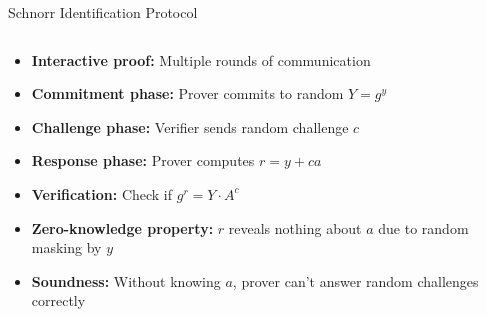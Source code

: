 \documentclass[aspectratio=169, lualatex, handout]{beamer}
\begin{document}
\begin{frame}{Schnorr Identification Protocol}
	\begin{columns}[c]
		\begin{column}{0.6\textwidth}
			\begin{itemize}
				\item \textbf{Interactive proof:} Multiple rounds of communication
				\item \textbf{Commitment phase:} Prover commits to random $Y = g^y$
				\item \textbf{Challenge phase:} Verifier sends random challenge $c$
				\item \textbf{Response phase:} Prover computes $r = y + ca$
				\item \textbf{Verification:} Check if $g^r = Y \cdot A^c$
				\item \textbf{Zero-knowledge property:} $r$ reveals nothing about $a$ due to random masking by $y$
				\item \textbf{Soundness:} Without knowing $a$, prover can't answer random challenges correctly
			\end{itemize}
		\end{column}
		\begin{column}{0.4\textwidth}
			\vspace{-1.5cm}
			\begin{center}\end{center}
		\end{column}
	\end{columns}
\end{frame}
\end{document}
